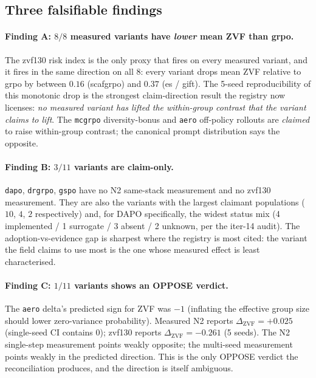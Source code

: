 \subsection{Three falsifiable findings}

\paragraph{Finding A: $8/8$ measured variants have \emph{lower} mean ZVF
than grpo.}
The zvf130 risk index is the only proxy that fires on every measured
variant, and it fires in the same direction on all 8: every variant
drops mean ZVF relative to grpo by between $0.16$ (scafgrpo) and $0.37$
(es / gift). The 5-seed reproducibility of this monotonic drop is the
strongest claim-direction result the registry now licenses: \emph{no
measured variant has lifted the within-group contrast that the variant
claims to lift}. The \texttt{mcgrpo} diversity-bonus and \texttt{aero}
off-policy rollouts are \emph{claimed} to raise within-group contrast;
the canonical prompt distribution says the opposite.

\paragraph{Finding B: $3/11$ variants are claim-only.}
\texttt{dapo}, \texttt{drgrpo}, \texttt{gspo} have no N2 same-stack
measurement and no zvf130 measurement. They are also the variants with
the largest claimant populations ($10$, $4$, $2$ respectively) and,
for DAPO specifically, the widest status mix (4 implemented / 1
surrogate / 3 absent / 2 unknown, per the iter-14 audit). The
adoption-vs-evidence gap is sharpest where the registry is most cited:
the variant the field claims to use most is the one whose measured
effect is least characterised.

\paragraph{Finding C: $1/11$ variants shows an OPPOSE verdict.}
The \texttt{aero} delta's predicted sign for ZVF was $-1$ (inflating
the effective group size should lower zero-variance probability).
Measured N2 reports $\Delta_{\text{ZVF}}{=}+0.025$ (single-seed CI
contains 0); zvf130 reports $\Delta_{\text{ZVF}}{=}-0.261$ (5 seeds).
The N2 single-step measurement points weakly opposite; the
multi-seed measurement points weakly in the predicted direction. This
is the only OPPOSE verdict the reconciliation produces, and the
direction is itself ambiguous.

